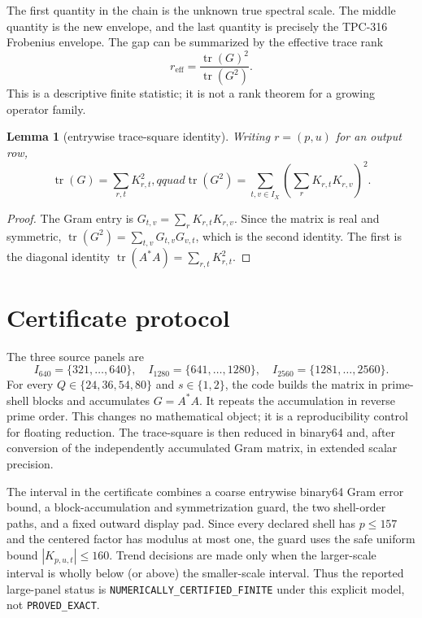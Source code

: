 \documentclass[10pt,a4paper]{article}
\newtheorem{lemma}{Lemma}
\newcommand{\tr}{\operatorname{tr}}
\begin{document}
The first quantity in the chain is the unknown true spectral scale.  The
middle quantity is the new envelope, and the last quantity is precisely the
TPC-316 Frobenius envelope.  The gap can be summarized by the effective trace
rank
\[
 r_{\mathrm{eff}}=\frac{\tr(G)^2}{\tr(G^2)}.
\]
This is a descriptive finite statistic; it is not a rank theorem for a
growing operator family.

\begin{lemma}[entrywise trace-square identity]
Writing $r=(p,u)$ for an output row,
\begin{equation}
 \tr(G)=\sum_{r,t}K_{r,t}^2,qquad
 \tr(G^2)=\sum_{t,v\in I_X}
 \left(\sum_rK_{r,t}K_{r,v}\right)^2.
 \label{eq:trace-square}
\end{equation}
\end{lemma}

\begin{proof}
The Gram entry is $G_{t,v}=\sum_rK_{r,t}K_{r,v}$.  Since the matrix is real
and symmetric, $\tr(G^2)=\sum_{t,v}G_{t,v}G_{v,t}$, which is the second
identity.  The first is the diagonal identity $\tr(A^*A)=\sum_{r,t}K_{r,t}^2$.
\end{proof}

\section{Certificate protocol}

The three source panels are
\[
 I_{640}=\{321,\ldots,640\},\quad
 I_{1280}=\{641,\ldots,1280\},\quad
 I_{2560}=\{1281,\ldots,2560\}.
\]
For every $Q\in\{24,36,54,80\}$ and $s\in\{1,2\}$, the code builds the
matrix in prime-shell blocks and accumulates $G=A^*A$.  It repeats the
accumulation in reverse prime order.  This changes no mathematical object; it
is a reproducibility control for floating reduction.  The trace-square is
then reduced in binary64 and, after conversion of the independently
accumulated Gram matrix, in extended scalar precision.

The interval in the certificate combines a coarse entrywise binary64 Gram
error bound, a block-accumulation and symmetrization guard, the two shell-order
paths, and a fixed outward display pad.  Since every declared shell has
$p\leq157$ and the centered factor has modulus at most one, the guard uses the
safe uniform bound $|K_{p,u,t}|\leq160$.  Trend decisions
are made only when the larger-scale interval is wholly below (or above) the
smaller-scale interval.  Thus the reported large-panel status is
\texttt{NUMERICALLY\_CERTIFIED\_FINITE} under this explicit model, not
\texttt{PROVED\_EXACT}.
\end{document}
